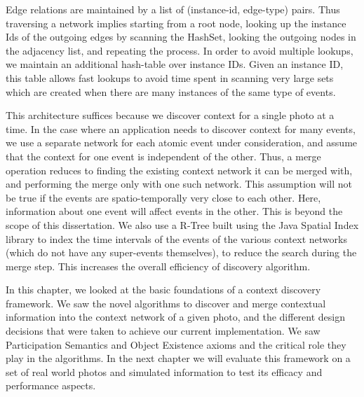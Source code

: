 Edge relations are maintained by a list of (instance-id, edge-type) pairs. Thus traversing a network implies starting from a root node, looking up the instance Ids of the outgoing edges by scanning the HashSet, looking the outgoing nodes in the adjacency list, and repeating the process. In order to avoid multiple lookups, we maintain an additional hash-table over instance IDs. Given an instance ID, this table allows fast lookups to avoid time spent in scanning very large sets which are created when there are many instances of the same type of events.

This architecture suffices because we discover context for a single photo at a time. In the case where an application needs to discover context for many events, we use a separate network for each atomic event under consideration, and assume that the context for one event is independent of the other. Thus, a merge operation reduces to finding the existing context network it can be merged with, and performing the merge only with one such network. This assumption will not be true if the events are spatio-temporally very close to each other. Here, information about one event will affect events in the other. This is beyond the scope of this dissertation. We also use a R-Tree built using the Java Spatial Index library to index the time intervals of the events of the various context networks (which do not have any super-events themselves), to reduce the search during the merge step. This increases the overall efficiency of discovery algorithm.

In this chapter, we looked at the basic foundations of a context discovery framework. We saw the novel algorithms to discover and merge contextual information into the context network of a given photo, and the different design decisions that were taken to achieve our current implementation. We saw Participation Semantics and Object Existence axioms and the critical role they play in the algorithms. In the next chapter we will evaluate this framework on a set of real world photos and simulated information to test its efficacy and performance aspects.